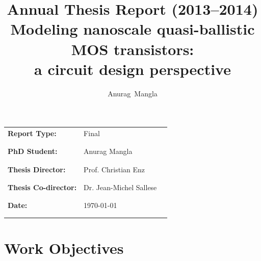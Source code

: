 \documentclass[11pt, a4paper]{article}
\begin{document}
\vspace{100pt}
\title{\normalsize\bfseries Annual Thesis Report (2013--2014)\\
\vspace{10pt}
\Large\bfseries Modeling nanoscale quasi-ballistic MOS transistors:\\ a circuit design perspective
}

\author{Anurag~Mangla}
\maketitle %
\thispagestyle{firstpage}
\vspace{4cm}
\begin{tabular}{m{6cm} m{5cm} m{3cm}}
                 \bfseries{Report Type:} & Final & \\\\\\
                 \bfseries{PhD Student:} & Anurag Mangla & \dotfill{} \\\\\\
                 \bfseries{Thesis Director:} & Prof. Christian Enz & \dotfill{} \\\\\\
                 \bfseries{Thesis Co-director:} & Dr. Jean-Michel Sallese & \dotfill{} \\\\\\
                 \bfseries{Date:} & \today & \\\\\\
               \end{tabular}%
\newpage
\setcounter{page}{1}
\pagestyle{fancy}
\fancyhead{} %
\setlength{\headheight}{24pt}
\fancyfoot{} %
\fancyfoot[RE,LO]{\thepage}

\section{Work Objectives}
\blindtext
\end{document}
